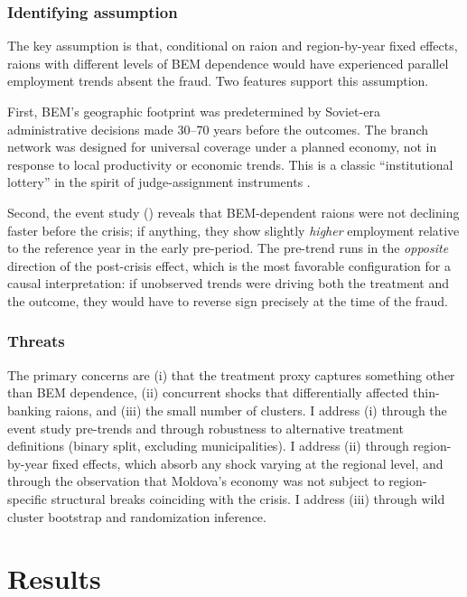 \documentclass[12pt]{article}
\begin{document}
\subsubsection*{Identifying assumption} The key assumption is that, conditional on raion and region-by-year fixed effects, raions with different levels of BEM dependence would have experienced parallel employment trends absent the fraud. Two features support this assumption.

First, BEM's geographic footprint was predetermined by Soviet-era administrative decisions made 30--70 years before the outcomes. The branch network was designed for universal coverage under a planned economy, not in response to local productivity or economic trends. This is a classic ``institutional lottery'' in the spirit of judge-assignment instruments \citep{kling2006incarceration}.

Second, the event study () reveals that BEM-dependent raions were not declining faster before the crisis; if anything, they show slightly \emph{higher} employment relative to the reference year in the early pre-period. The pre-trend runs in the \emph{opposite} direction of the post-crisis effect, which is the most favorable configuration for a causal interpretation: if unobserved trends were driving both the treatment and the outcome, they would have to reverse sign precisely at the time of the fraud.

\subsubsection*{Threats} The primary concerns are (i) that the treatment proxy captures something other than BEM dependence, (ii) concurrent shocks that differentially affected thin-banking raions, and (iii) the small number of clusters. I address (i) through the event study pre-trends and through robustness to alternative treatment definitions (binary split, excluding municipalities). I address (ii) through region-by-year fixed effects, which absorb any shock varying at the regional level, and through the observation that Moldova's economy was not subject to region-specific structural breaks coinciding with the crisis. I address (iii) through wild cluster bootstrap and randomization inference.


\section{Results}
\label{sec:results}
\end{document}
